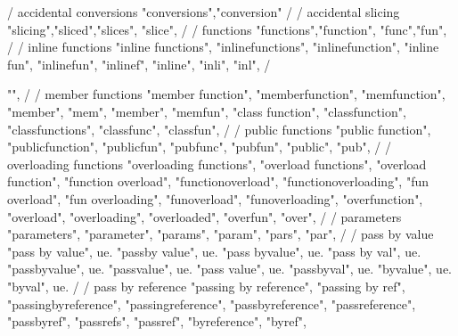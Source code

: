         / accidental conversions
        "conversions","conversion"
        /
        / accidental slicing 
        "slicing","sliced","slices", "slice",
        /
        / functions
        "functions","function", "func","fun",
        /
        / inline functions
        "inline functions",  
        "inlinefunctions",  
        "inlinefunction",  
        "inline fun",  
        "inlinefun",  
        "inlinef", 
        "inline", 
        "inli", 
        "inl", 
        / {"", 
        /
        / member functions
        "member function",  
        "memberfunction",  
        "memfunction",  
        "member",  
        "mem",  
        "member",  
        "memfun",  
        "class function",  
        "classfunction", 
        "classfunctions", 
        "classfunc",  
        "classfun",  
        /
        / public functions
        "public function", 
        "publicfunction", 
        "publicfun", 
        "pubfunc", 
        "pubfun", 
        "public",  
        "pub",  
        /
        / overloading functions
        "overloading functions", 
        "overload functions", 
        "overload function", 
        "function overload", 
        "functionoverload", 
        "functionoverloading", 
        "fun overload", 
        "fun overloading", 
        "funoverload", 
        "funoverloading", 
        "overfunction",  
        "overload",  
        "overloading", 
        "overloaded",  
        "overfun",  
        "over",  
        /
        / parameters
        "parameters",  
        "parameter",  
        "params",  
        "param",  
        "pars",  
        "par",  
        /
        / pass by value
        "pass by value", ue. 
        "passby value", ue. 
        "pass byvalue", ue. 
        "pass by val", ue. 
        "passbyvalue", ue. 
        "passvalue", ue. 
        "pass value", ue. 
        "passbyval", ue. 
        "byvalue", ue. 
        "byval", ue. 
        /
        / pass by reference
        "passing by reference",  
        "passing by ref",  
        "passingbyreference",  
        "passingreference",  
        "passbyreference",  
        "passreference",  
        "passbyref",  
        "passrefs",  
        "passref",  
        "byreference", 
        "byref", 

}
